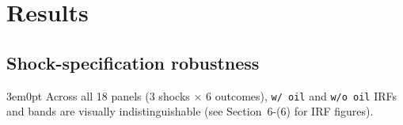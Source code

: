 \documentclass[12pt]{article}
\newenvironment{bodyL2}{\begin{adjustwidth}{3em}{0pt}}{\end{adjustwidth}}
\begin{document}
\section{Results}

\subsection{Shock-specification robustness}
\begin{bodyL2}
Across all 18 panels (3 shocks $\times$ 6 outcomes), \texttt{w/ oil} and \texttt{w/o oil}
IRFs and bands are visually indistinguishable
(see Section~6-(6) for IRF figures).
\end{bodyL2}
\end{document}
